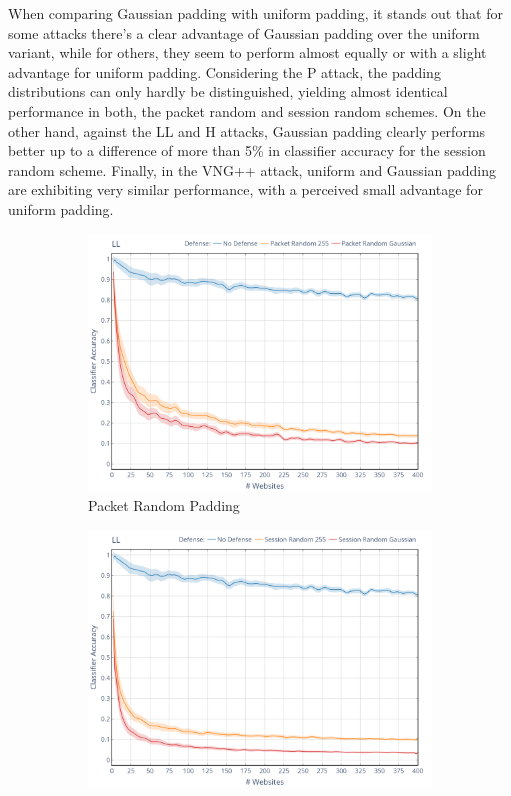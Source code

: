 \documentclass[
	ruledheaders=chapter,
	class=report,
	thesis={type=master, department=inf},
	accentcolor=1c,
	custommargins=true,
	marginpar=false,
	parskip=half-,
	fontsize=11pt,
]{tudapub}
\begin{document}
	When comparing Gaussian padding with uniform padding, it stands out that for some attacks there's a clear advantage of Gaussian padding over the uniform variant, while for others, they seem to perform almost equally or with a slight advantage for uniform padding. Considering the P attack, the padding distributions can only hardly be distinguished, yielding almost identical performance in both, the packet random and session random schemes. On the other hand, against the LL and H attacks, Gaussian padding clearly performs better up to a difference of more than 5\% in classifier accuracy for the session random scheme. Finally, in the VNG++ attack, uniform and Gaussian padding are exhibiting very similar performance, with a perceived small advantage for uniform padding.

	\begin{figure}
		\begin{subfigure}{0.495\textwidth}
			\centering
			\includegraphics[width=\textwidth]{plots/performance_ll_pkt.png}
			\caption{Packet Random Padding}
		\end{subfigure}
		\hfill
		\begin{subfigure}{0.495\textwidth}
			\centering
			\includegraphics[width=\textwidth]{plots/performance_ll_ses.png}

\end{subfigure}
\end{figure}
\end{document}
